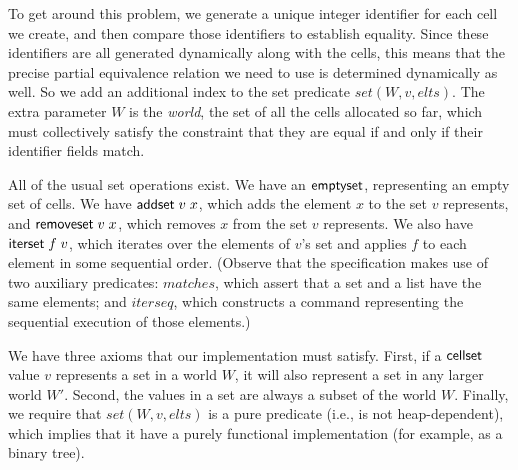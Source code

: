 \documentclass[preprint,natbib]{sigplanconf}
\begin{document}
To get around this problem, we generate a unique integer identifier
for each cell we create, and then compare those identifiers to
establish equality. Since these identifiers are all generated
dynamically along with the cells, this means that the precise partial
equivalence relation we need to use is determined dynamically as
well. So we add an additional index to the set predicate $set(W, v,
elts)$. The extra parameter $W$ is the \emph{world}, the set of all
the cells allocated so far, which must collectively satisfy the
constraint that they are equal if and only if their identifier fields
match. 

All of the usual set operations exist. We have an $\mbox{\textsf{{emptyset}}}$,
representing an empty set of cells. We have $\mbox{\textsf{{addset}}}\;v\;x$,
which adds the element $x$ to the set $v$ represents, and
$\mbox{\textsf{{removeset}}}\;v\;x$, which removes $x$ from the set $v$
represents. We also have $\mbox{\textsf{{iterset}}}\;f\;v$, which iterates over
the elements of $v$'s set and applies $f$ to each element in some
sequential order. (Observe that the specification makes use of two 
auxiliary predicates: $matches$, which assert that a
set and a list have the same elements; and $iterseq$, which constructs
a command representing the sequential execution of those elements.) 

We have three axioms that our implementation must satisfy. First, if a
$\mbox{\textsf{{cellset}}}$ value $v$ represents a set in a world $W$, it will also
represent a set in any larger world $W'$. Second, the values in a set
are always a subset of the world $W$. Finally, we require that
$set(W,v,elts)$ is a pure predicate (i.e., is not heap-dependent),
which implies that it have a purely functional implementation (for
example, as a binary tree). 
\end{document}
